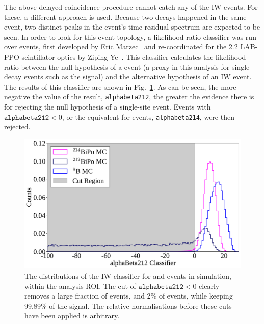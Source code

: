 The above delayed coincidence procedure cannot catch any of the IW  events. For these, a different approach is used. Because two decays happened in the same event, two distinct peaks in the event's time residual spectrum are expected to be seen. In order to look for this event topology, a likelihood-ratio classifier was run over events, first developed by Eric Marzec~\cite{marzecBiPoEventReduction2013} %
and re-coordinated for the \SI{2.2}{\gpl} LAB-PPO scintillator optics by Ziping Ye~\cite{yeTaggingInwindowBiPo2022}. %
This classifier calculates the likelihood ratio between the null hypothesis of a \onbb{} event (a proxy in this analysis for single-decay events such as the \beight{} signal) and the alternative hypothesis of an IW  event. The results of this classifier are shown in Fig.~\ref{fig:bipo_tagging_IW}. As can be seen, the more negative the value of the result, \texttt{alphabeta212}, the greater the evidence there is for rejecting the null hypothesis of a single-site event. Events with $\texttt{alphabeta212} < 0$, %
or the equivalent for  events, \texttt{alphabeta214}, were then rejected.

\begin{figure}[!th]
    \centering
    \includegraphics[width=\textwidth]{6_SolarAnalysis/images/bipo_tagging_1d.pdf}
    \caption[The distributions of the IW  classifier for  and \beight{} events in simulation, within the analysis ROI]
    {The distributions of the IW  classifier for  and \beight{} events in simulation, within the analysis ROI. The cut of $\texttt{alphabeta212} < 0$ clearly removes a large fraction of  events, and 2\% of  events, while keeping 99.89\% of the \beight{} signal. The relative normalisations before these cuts have been applied is arbitrary.}
    \label{fig:bipo_tagging_IW}
\end{figure}

